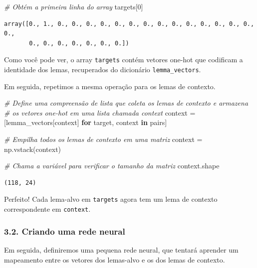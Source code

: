 \documentclass[
  brazilian,
]{article}
\newenvironment{Shaded}{}{}
\newcommand{\CommentTok}[1]{\textcolor[rgb]{0.38,0.63,0.69}{\textit{#1}}}
\newcommand{\ControlFlowTok}[1]{\textcolor[rgb]{0.00,0.44,0.13}{\textbf{#1}}}
\newcommand{\DecValTok}[1]{\textcolor[rgb]{0.25,0.63,0.44}{#1}}
\newcommand{\KeywordTok}[1]{\textcolor[rgb]{0.00,0.44,0.13}{\textbf{#1}}}
\newcommand{\NormalTok}[1]{#1}
\newcommand{\OperatorTok}[1]{\textcolor[rgb]{0.40,0.40,0.40}{#1}}
\begin{document}
\begin{Shaded}
\begin{Highlighting}[]
\CommentTok{\# Obtém a primeira linha do array}
\NormalTok{targets[}\DecValTok{0}\NormalTok{]}
\end{Highlighting}
\end{Shaded}

\begin{verbatim}
array([0., 1., 0., 0., 0., 0., 0., 0., 0., 0., 0., 0., 0., 0., 0., 0., 0.,
       0., 0., 0., 0., 0., 0., 0.])
\end{verbatim}

Como você pode ver, o array \texttt{targets} contém vetores one-hot que
codificam a identidade dos lemas, recuperados do dicionário
\texttt{lemma\_vectors}.

Em seguida, repetimos a mesma operação para os lemas de contexto.

\begin{Shaded}
\begin{Highlighting}[]
\CommentTok{\# Define uma compreensão de lista que coleta os lemas de contexto e armazena}
\CommentTok{\# os vetores one{-}hot em uma lista chamada \textquotesingle{}context\textquotesingle{}}
\NormalTok{context }\OperatorTok{=}\NormalTok{ [lemma\_vectors[context] }\ControlFlowTok{for}\NormalTok{ target, context }\KeywordTok{in}\NormalTok{ pairs]}

\CommentTok{\# Empilha todos os lemas de contexto em uma matriz}
\NormalTok{context }\OperatorTok{=}\NormalTok{ np.vstack(context)}

\CommentTok{\# Chama a variável para verificar o tamanho da matriz}
\NormalTok{context.shape}
\end{Highlighting}
\end{Shaded}

\begin{verbatim}
(118, 24)
\end{verbatim}

Perfeito! Cada lema-alvo em \texttt{targets} agora tem um lema de
contexto correspondente em \texttt{context}.

\hypertarget{criando-uma-rede-neural}{%
\subsubsection{3.2. Criando uma rede
neural}\label{criando-uma-rede-neural}}

Em seguida, definiremos uma pequena rede neural, que tentará aprender um
mapeamento entre os vetores dos lemas-alvo e os dos lemas de contexto.
\end{document}
